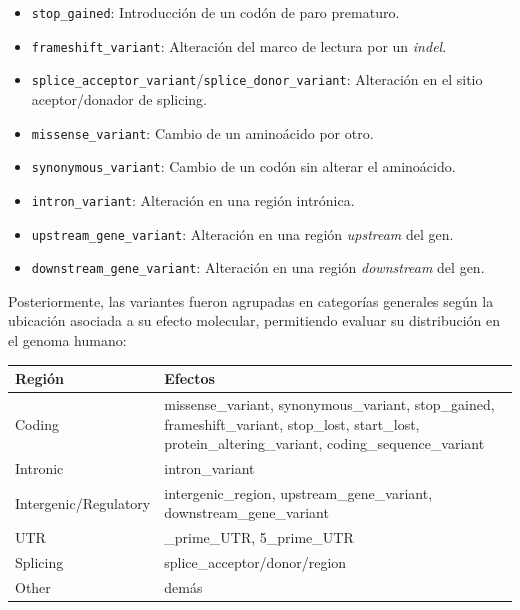 \documentclass[
  spanish,
  11pt,
]{article}
\begin{document}
\begin{itemize}
\item
  \texttt{stop\_gained}: Introducción de un codón de paro prematuro.
\item
  \texttt{frameshift\_variant}: Alteración del marco de lectura por un
  \emph{indel}.
\item
  \texttt{splice\_acceptor\_variant}/\texttt{splice\_donor\_variant}:
  Alteración en el sitio aceptor/donador de splicing.
\item
  \texttt{missense\_variant}: Cambio de un aminoácido por otro.
\item
  \texttt{synonymous\_variant}: Cambio de un codón sin alterar el
  aminoácido.
\item
  \texttt{intron\_variant}: Alteración en una región intrónica.
\item
  \texttt{upstream\_gene\_variant}: Alteración en una región
  \emph{upstream} del gen.
\item
  \texttt{downstream\_gene\_variant}: Alteración en una región
  \emph{downstream} del gen.
\end{itemize}

Posteriormente, las variantes fueron agrupadas en categorías generales
según la ubicación asociada a su efecto molecular, permitiendo evaluar
su distribución en el genoma humano:

\begin{longtable}[]{@{}
  >{\raggedright\arraybackslash}p{}
  >{\raggedright\arraybackslash}p{}@{}}
\toprule\noalign{}
\begin{minipage}[b]{\linewidth}\raggedright
Región
\end{minipage} & \begin{minipage}[b]{\linewidth}\raggedright
Efectos
\end{minipage} \\
\midrule\noalign{}
\endhead
\bottomrule\noalign{}
\endlastfoot
Coding & missense\_variant, synonymous\_variant, stop\_gained,
frameshift\_variant, stop\_lost, start\_lost,
protein\_altering\_variant, coding\_sequence\_variant \\
Intronic & intron\_variant \\
Intergenic/Regulatory & intergenic\_region, upstream\_gene\_variant,
downstream\_gene\_variant \\
UTR & 3\_prime\_UTR, 5\_prime\_UTR \\
Splicing & splice\_acceptor/donor/region \\
Other & demás \\
\end{longtable}
\end{document}
